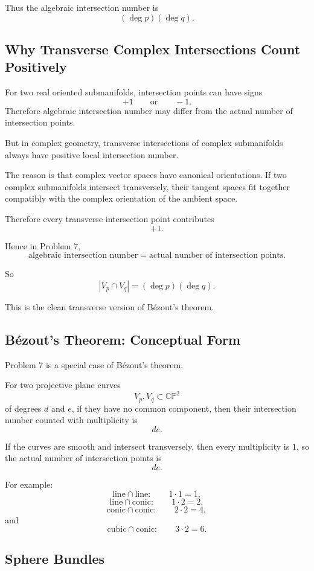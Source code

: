 \documentclass[12pt,a4paper]{article}
\theoremstyle{notespace}
\begin{document}
Thus the algebraic intersection number is
\[
(\deg p)(\deg q).
\]

\subsection{Why Transverse Complex Intersections Count Positively}

For two real oriented submanifolds, intersection points can have signs
\[
+1
\qquad\text{or}\qquad
-1.
\]
Therefore algebraic intersection number may differ from the actual number of
intersection points.

But in complex geometry, transverse intersections of complex submanifolds always
have positive local intersection number.

The reason is that complex vector spaces have canonical orientations. If two
complex submanifolds intersect transversely, their tangent spaces fit together
compatibly with the complex orientation of the ambient space.

Therefore every transverse intersection point contributes
\[
+1.
\]

Hence in Problem 7,
\[
\text{algebraic intersection number}
=
\text{actual number of intersection points}.
\]

So
\[
|V_p\cap V_q|=(\deg p)(\deg q).
\]

This is the clean transverse version of B\'ezout's theorem.

\subsection{B\'ezout's Theorem: Conceptual Form}

Problem 7 is a special case of B\'ezout's theorem.

For two projective plane curves
\[
V_p,V_q\subset \mathbb{CP}^2
\]
of degrees \(d\) and \(e\), if they have no common component, then their
intersection number counted with multiplicity is
\[
de.
\]

If the curves are smooth and intersect transversely, then every multiplicity is
\(1\), so the actual number of intersection points is
\[
de.
\]

For example:
\[
\text{line}\cap\text{line}: \qquad 1\cdot 1=1,
\]
\[
\text{line}\cap\text{conic}: \qquad 1\cdot 2=2,
\]
\[
\text{conic}\cap\text{conic}: \qquad 2\cdot 2=4,
\]
and
\[
\text{cubic}\cap\text{conic}: \qquad 3\cdot 2=6.
\]

\subsection{Sphere Bundles}
\end{document}
